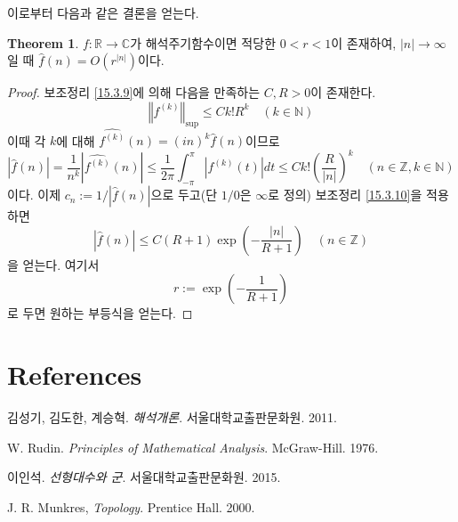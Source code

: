 \documentclass[11pt]{book}
\numberwithin{equation}{chapter}
\def\NN{\mathbb{N}}
\def\ZZ{\mathbb{Z}}
\def\RR{\mathbb{R}}
\def\CC{\mathbb{C}}
\newcommand{\abs}[1]{\left\vert#1\right\vert}
\newcommand{\norm}[1]{\left\Vert#1\right\Vert}
\newcommand{\paren}[1]{\left(#1\right)}
\theoremstyle{definition}
\newtheorem{thm}{Theorem}[section]
\begin{document}
이로부터 다음과 같은 결론을 얻는다.

\begin{thm}
    \(f : \RR \to \CC\)가 해석주기함수이면 적당한 \( 0 < r < 1\)이 존재하여, \(\abs{n} \to \infty\)일 때 \(\hat{f}(n) = O(r^{\abs{n}})\)이다.
\end{thm}

\begin{proof}
    보조정리 \ref{15.3.9}에 의해 다음을 만족하는 \(C, R > 0\)이 존재한다.
    \[
        \norm{f^{(k)}}_{\sup} \le C k! R^k \quad (k \in \NN)
    \]
    이때 각 \(k\)에 대해 \(\widehat{f^{(k)}}(n) = (in)^k \hat{f}(n)\)이므로
    \[
        \abs{\hat{f}(n)} = \frac{1}{n^k} \abs{\widehat{f^{(k)}}(n)} \le \frac{1}{2\pi} \int_{-\pi}^\pi \abs{f^{(k)}(t)} dt \le Ck! \paren{\frac{R}{\abs{n}}}^k \quad (n \in \ZZ, k \in \NN)
    \]
    이다. 이제 \(c_n := 1/\abs{\hat{f}(n)}\)으로 두고(단 \(1/0\)은 \(\infty\)로 정의) 보조정리 \ref{15.3.10}을 적용하면
    \[
        \abs{\hat{f}(n)} \le C(R+1) \exp \paren{-\frac{\abs{n}}{R+1}} \quad (n \in \ZZ)
    \]
    을 얻는다. 여기서
    \[
        r := \exp \paren{-\frac{1}{R+1}}
    \]
    로 두면 원하는 부등식을 얻는다.
\end{proof}


\chapter*{References}
\begin{enumerate}[label={[\arabic*]}]
    \item\label{ref1} 김성기, 김도한, 계승혁. \emph{해석개론}. 서울대학교출판문화원. 2011.
    \item\label{ref2} W. Rudin. \emph{Principles of Mathematical Analysis}. McGraw-Hill. 1976.
    \item\label{ref3} 이인석. \emph{선형대수와 군}. 서울대학교출판문화원. 2015.
    \item\label{ref4} J. R. Munkres, \emph{Topology}. Prentice Hall. 2000.
\end{enumerate}
\end{document}
